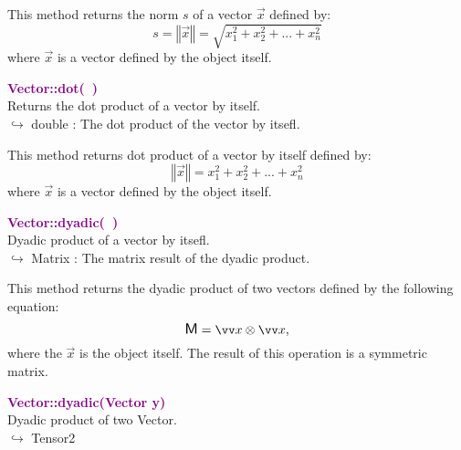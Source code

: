 This method returns the norm $s$ of a vector $\overrightarrow{x}$ defined by:
\begin{equation*}
s = \left\Vert \overrightarrow{x} \right\Vert = \sqrt {x_{1}^2 + x_{2}^2 + ... + x_{n}^2}
\end{equation*}
where $\overrightarrow{x}$ is a vector defined by the object itself.

\textcolor{purple}{\textbf{Vector::dot(~)}}\label{Vector::dot()}\\
Returns the dot product of a vector by itself.\\ \hspace*{10mm}$\hookrightarrow$ double : The dot product of the vector by itsefl.

This method returns dot product of a vector by itself defined by:
\begin{equation*}
 \left\Vert \overrightarrow{x} \right\Vert  = x_{1}^2 + x_{2}^2 + ... + x_{n}^2
\end{equation*}
where $\overrightarrow{x}$ is a vector defined by the object itself.

\textcolor{purple}{\textbf{Vector::dyadic(~)}}\label{Vector::dyadic()}\\
Dyadic product of a vector by itsefl.\\ \hspace*{10mm}$\hookrightarrow$ Matrix : The matrix result of the dyadic product.

This method returns the dyadic product of two vectors defined by the following equation:
\begin{equation*}
\M = \overrightarrow{x}\otimes\overrightarrow{x},
\end{equation*}
where the $\overrightarrow{x}$ is the object itself.
The result of this operation is a symmetric matrix.

\textcolor{purple}{\textbf{Vector::dyadic(Vector y)}}\label{Vector::dyadic(Vector y)}\\
Dyadic product of two Vector.\\ \hspace*{10mm}$\hookrightarrow$ Tensor2

